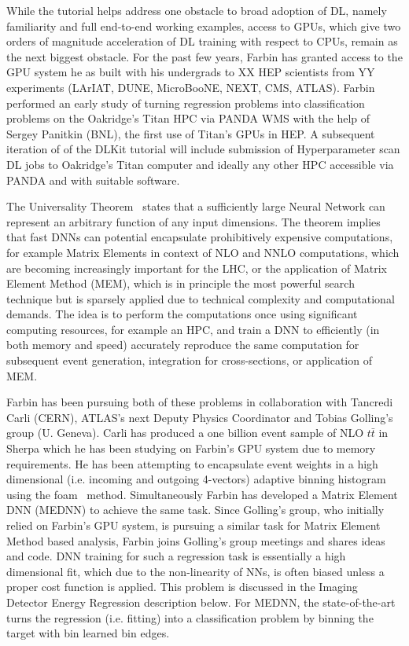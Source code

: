 While the tutorial helps address one obstacle to broad adoption of DL,
namely familiarity and full end-to-end working examples, access to
GPUs, which give two orders of magnitude acceleration of DL training
with respect to CPUs, remain as the next biggest obstacle. For the past
few years, Farbin has granted access to the GPU system he as built
with his undergrads to XX HEP scientists from YY experiments (LArIAT,
DUNE, MicroBooNE, NEXT, CMS, ATLAS). Farbin performed an early study
of turning regression problems into classification problems on the
Oakridge's Titan HPC via PANDA WMS with the help of Sergey Panitkin (BNL),
the first use of Titan's GPUs in HEP. A subsequent iteration of of the
DLKit tutorial will include submission of Hyperparameter scan DL jobs
to Oakridge's Titan computer and ideally any other HPC accessible via
PANDA and with suitable software.


The Universality Theorem~\cite{} states that a sufficiently large
Neural Network can represent an arbitrary function of any input
dimensions. The theorem implies that fast DNNs can potential
encapsulate prohibitively expensive computations, for example Matrix
Elements in context of NLO and NNLO computations, which are becoming
increasingly important for the LHC, or the application of Matrix
Element Method (MEM), which is in principle the most powerful search
technique but is sparsely applied due to technical complexity and
computational demands. The idea is to perform the computations once
using significant computing resources, for example an HPC, and train a
DNN to efficiently (in both memory and speed) accurately reproduce the
same computation for subsequent event generation, integration for
cross-sections, or application of MEM.

Farbin has been pursuing both of these problems in collaboration with
Tancredi Carli (CERN), ATLAS's next Deputy Physics Coordinator and
Tobias Golling's group (U. Geneva). Carli has produced a one billion
event sample of NLO $t\bar{t}$ in Sherpa which he has been studying on
Farbin's GPU system due to memory requirements. He has been attempting
to encapsulate event weights in a high dimensional (i.e. incoming and
outgoing 4-vectors) adaptive binning histogram using the foam~\cite{}
method. Simultaneously Farbin has developed a Matrix Element DNN
(MEDNN) to achieve the same task. Since Golling's group, who initially
relied on Farbin's GPU system, is pursuing a similar task for Matrix
Element Method based analysis, Farbin joins Golling's group meetings
and shares ideas and code. DNN training for such a regression task is
essentially a high dimensional fit, which due to the non-linearity of
NNs, is often biased unless a proper cost function is applied. This
problem is discussed in the Imaging Detector Energy Regression
description below. For MEDNN, the state-of-the-art turns the
regression (i.e. fitting) into a classification problem by binning the
target with bin learned bin edges.


